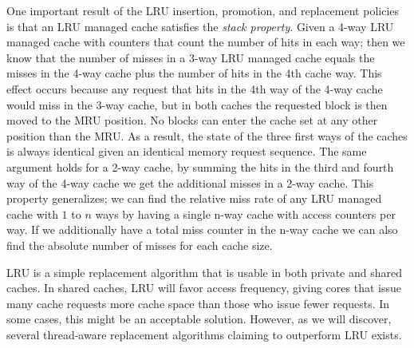 One important result of the LRU insertion, promotion, and replacement policies is that an LRU managed cache satisfies the \textit{stack property}.
Given a 4-way LRU managed cache with counters that count the number of hits in each way; then we know that the number of misses in a 3-way LRU managed cache equals the misses in the 4-way cache plus the number of hits in the 4th cache way.
This effect occurs because any request that hits in the 4th way of the 4-way cache would miss in the 3-way cache, but in both caches the requested block is then moved to the MRU position.
No blocks can enter the cache set at any other position than the MRU.
As a result, the state of the three first ways of the caches is always identical given an identical memory request sequence.
The same argument holds for a 2-way cache, by summing the hits in the third and fourth way of the 4-way cache we get the additional misses in a 2-way cache.
This property generalizes; we can find the relative miss rate of any LRU managed cache with $1$ to $n$ ways by having a single n-way cache with access counters per way.
If we additionally have a total miss counter in the n-way cache we can also find the absolute number of misses for each cache size.

LRU is a simple replacement algorithm that is usable in both private and shared caches.
In shared caches, LRU will favor access frequency, giving cores that issue many cache requests more cache space than those who issue fewer requests. 
In some cases, this might be an acceptable solution. 
However, as we will discover, several thread-aware replacement algorithms claiming to outperform LRU exists. 
